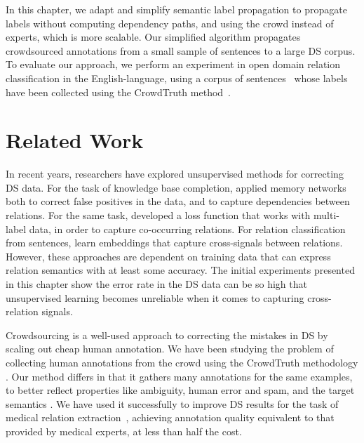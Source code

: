 In this chapter, we adapt and simplify semantic label propagation to propagate labels without computing dependency paths, and using the crowd instead of experts, which is more scalable. Our simplified algorithm propagates crowdsourced annotations from a small sample of sentences to a large DS corpus. To evaluate our approach, we perform an experiment in open domain relation classification in the English-language, using a corpus of sentences~\cite{dumitrache2017false} whose labels have been collected using the CrowdTruth method~\cite{aroyo2014threesides}.

\section{Related Work}


In recent years, researchers have explored unsupervised methods for correcting DS data. For the task of knowledge base completion, \cite{DBLP:conf/ijcai/FengGQLL17} applied memory networks both to correct false positives in the data, and to capture dependencies between relations. For the same task, \cite{Jiang2016RelationEW} developed a loss function that works with multi-label data, in order to capture co-occurring relations. For relation classification from sentences, \cite{DBLP:conf/acl/SantosXZ15} learn embeddings that capture cross-signals between relations. However, these approaches are dependent on training data that can express relation semantics with at least some accuracy. The initial experiments presented in this chapter show the error rate in the DS data can be so high that unsupervised learning becomes unreliable when it comes to capturing cross-relation signals.

Crowdsourcing is a well-used approach to correcting the mistakes in DS by scaling out cheap human annotation.  We have been studying the problem of collecting human annotations from the crowd using the CrowdTruth methodology \cite{aroyo2013crowd}.  Our method differs in that it gathers many annotations for the same examples, to better reflect properties like ambiguity, human error and spam, and the target semantics \cite{aroyo2014threesides}. We have used it successfully to improve DS results for the task of medical relation extraction~\cite{DBLP:journals/corr/DumitracheAW17}, achieving annotation quality equivalent to that provided by medical experts, at less than half the cost.


